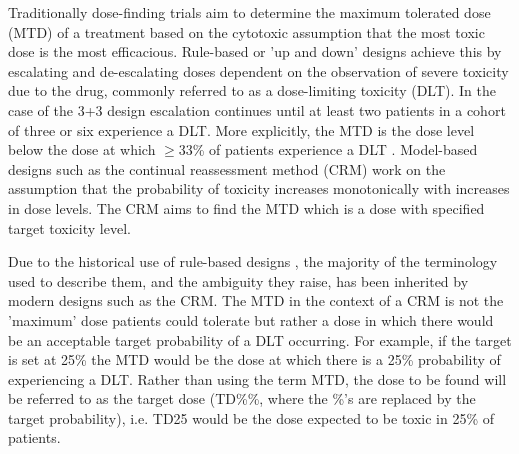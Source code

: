 Traditionally dose-finding trials aim to determine the maximum tolerated dose (MTD) of a treatment based on the cytotoxic assumption that the most toxic dose is the most efficacious. Rule-based or 'up and down' designs achieve this by escalating and de-escalating doses dependent on the observation of severe toxicity due to the drug,  commonly referred to as a dose-limiting toxicity (DLT). In the case of the 3+3 design escalation continues until at least two patients in a cohort of three or six experience a DLT. More explicitly, the MTD is the dose level below the dose at which $\geq$33\% of patients experience a DLT \cite{letourneauDoseEscalationMethods2009}. Model-based designs such as the continual reassessment method (CRM) \cite{oquigleyContinualReassessmentMethod1990} work on the assumption that the probability of toxicity increases monotonically with increases in dose levels. The CRM aims to find the MTD which is a dose with specified target toxicity level. 

Due to the historical use of rule-based designs  \cite{rogatkoTranslationInnovativeDesigns2007, chiuzanDosefindingDesignsTrials2017}, the majority of the terminology used to describe them, and the ambiguity they raise, has been inherited by modern designs such as the CRM. The MTD in the context of a CRM is not the 'maximum' dose patients could tolerate but rather a dose in which there would be an acceptable target probability of a DLT occurring. For example, if the target is set at 25\% the MTD would be the dose at which there is a 25\% probability of experiencing a DLT. Rather than using the term MTD, the dose to be found will be referred to as the target dose (TD\%\%, where the \%'s are replaced by the target probability), i.e. TD25 would be the dose expected to be toxic in 25\% of patients.

